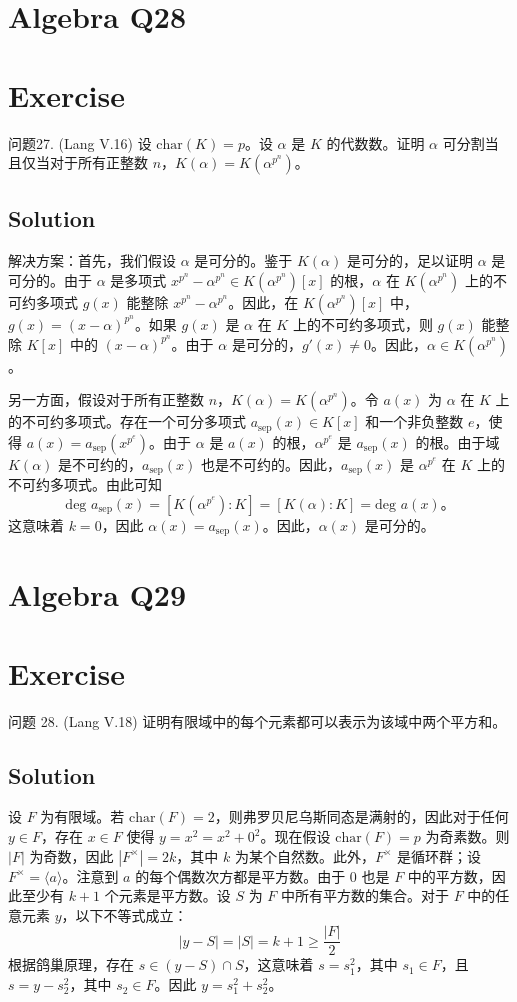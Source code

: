 \documentclass[12pt]{book}
\begin{document}
\section{Algebra Q28}
\section*{Exercise}
问题27. (Lang V.16) 设 $\text{char}(K) = p$。设 $\alpha$ 是 $K$ 的代数数。证明 $\alpha$ 可分割当且仅当对于所有正整数 $n$，$K(\alpha) = K(\alpha^{p^n})$。



\subsection*{Solution}
解决方案：首先，我们假设 $\alpha$ 是可分的。鉴于 $K(\alpha)$ 是可分的，足以证明 $\alpha$ 是可分的。由于 $\alpha$ 是多项式 $x^{p^n} - \alpha^{p^n} \in K(\alpha^{p^n})[x]$ 的根，$\alpha$ 在 $K(\alpha^{p^n})$ 上的不可约多项式 $g(x)$ 能整除 $x^{p^n} - \alpha^{p^n}$。因此，在 $K(\alpha^{p^n})[x]$ 中，$g(x) = (x - \alpha)^{p^n}$。如果 $g(x)$ 是 $\alpha$ 在 $K$ 上的不可约多项式，则 $g(x)$ 能整除 $K[x]$ 中的 $(x - \alpha)^{p^n}$。由于 $\alpha$ 是可分的，$g'(x) \neq 0$。因此，$\alpha \in K(\alpha^{p^n})$。

另一方面，假设对于所有正整数 $n$，$K(\alpha) = K(\alpha^{p^n})$。令 $a(x)$ 为 $\alpha$ 在 $K$ 上的不可约多项式。存在一个可分多项式 $a_{\text{sep}}(x) \in K[x]$ 和一个非负整数 $e$，使得 $a(x) = a_{\text{sep}}(x^{p^e})$。由于 $\alpha$ 是 $a(x)$ 的根，$\alpha^{p^e}$ 是 $a_{\text{sep}}(x)$ 的根。由于域 $K(\alpha)$ 是不可约的，$a_{\text{sep}}(x)$ 也是不可约的。因此，$a_{\text{sep}}(x)$ 是 $\alpha^{p^e}$ 在 $K$ 上的不可约多项式。由此可知
\[
\text{deg } a_{\text{sep}}(x) = [K(\alpha^{p^e}) : K] = [K(\alpha) : K] = \text{deg } a(x)。
\]
这意味着 $k = 0$，因此 $\alpha(x) = a_{\text{sep}}(x)$。因此，$\alpha(x)$ 是可分的。
\newpage
\section{Algebra Q29}
\section*{Exercise}
问题 28. (Lang V.18) 证明有限域中的每个元素都可以表示为该域中两个平方和。



\subsection*{Solution}
设 $F$ 为有限域。若 $\text{char}(F) = 2$，则弗罗贝尼乌斯同态是满射的，因此对于任何 $y \in F$，存在 $x \in F$ 使得 $y = x^2 = x^2 + 0^2$。现在假设 $\text{char}(F) = p$ 为奇素数。则 $|F|$ 为奇数，因此 $|F^\times| = 2k$，其中 $k$ 为某个自然数。此外，$F^\times$ 是循环群；设 $F^\times = \langle a \rangle$。注意到 $a$ 的每个偶数次方都是平方数。由于 $0$ 也是 $F$ 中的平方数，因此至少有 $k + 1$ 个元素是平方数。设 $S$ 为 $F$ 中所有平方数的集合。对于 $F$ 中的任意元素 $y$，以下不等式成立：
\[
|y - S| = |S| = k + 1 \geq \frac{|F|}{2}
\]
根据鸽巢原理，存在 $s \in (y - S) \cap S$，这意味着 $s = s_1^2$，其中 $s_1 \in F$，且 $s = y - s_2^2$，其中 $s_2 \in F$。因此 $y = s_1^2 + s_2^2$。
\newpage
\end{document}
